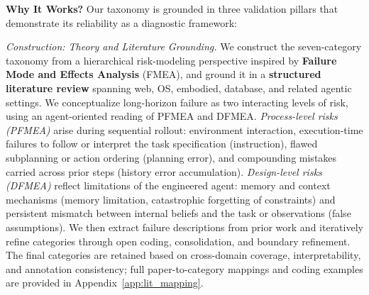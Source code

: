 \documentclass[11pt]{article}
\begin{document}



\textbf{Why It Works?}
Our taxonomy is grounded in three validation pillars that demonstrate its reliability as a diagnostic framework:

\textit{Construction: Theory and Literature Grounding.}
We construct the seven-category taxonomy from a hierarchical risk-modeling perspective inspired by \textbf{Failure Mode and Effects Analysis} (FMEA), and ground it in a \textbf{structured literature review} spanning web, OS, embodied, database, and related agentic settings. 
We conceptualize long-horizon failure as two interacting levels of risk, using an agent-oriented reading of PFMEA and DFMEA. \textit{Process-level risks (PFMEA)} arise during sequential rollout: environment interaction, execution-time failures to follow or interpret the task specification (instruction), flawed subplanning or action ordering (planning error), and compounding mistakes carried across prior steps (history error accumulation). \textit{Design-level risks (DFMEA)} reflect limitations of the engineered agent: memory and context mechanisms (memory limitation, catastrophic forgetting of constraints) and persistent mismatch between internal beliefs and the task or observations (false assumptions). 
We then extract failure descriptions from prior work and iteratively refine categories through open coding, consolidation, and boundary refinement.
The final categories are retained based on cross-domain coverage, interpretability, and annotation consistency; full paper-to-category mappings and coding examples are provided in Appendix~\ref{app:lit_mapping}.
\end{document}
